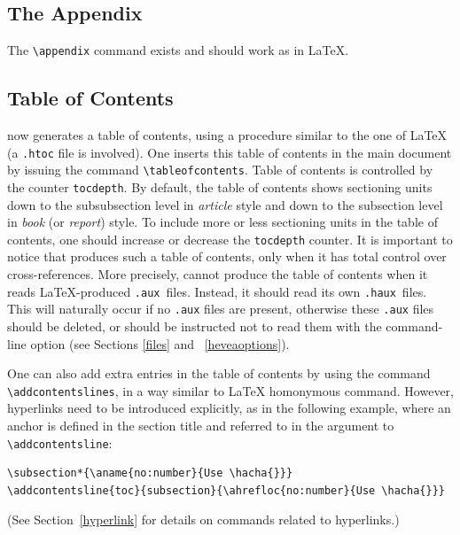 \subsection{The Appendix}
The \verb+\appendix+ command exists and should work as in \LaTeX.

\subsection{Table of Contents}
%
%
\hevea{} now generates a table of contents, using a procedure similar
to the one of \LaTeX
(a \texttt{.htoc} file is involved).
One inserts this table of contents in the main document by issuing
the command \verb+\tableofcontents+.
Table of contents is controlled by the counter  \verb+tocdepth+.
By default, the table of contents shows sectioning units down to the
subsubsection level in \textit{article} style and down to the subsection level
in \textit{book} (or \textit{report}) style. To include more or less
sectioning units in the
table of contents, one should increase or decrease the \verb+tocdepth+
counter.
It is important to notice that \hevea{} produces such a table of
contents, only when it has total control over cross-references.
More precisely, \hevea{} cannot produce the table of contents when it
reads \LaTeX{}-produced \texttt{.aux}~files.
Instead, it should read its own \texttt{.haux}~files.
This will naturally occur if no \texttt{.aux} files are present,
otherwise these \texttt{.aux} files should be deleted, or \hevea{}
should be instructed not to read them with the command-line option
(see Sections \ref{files} and ~\ref{heveaoptions}).

One can also add extra entries in the table of contents by using
the command \verb+\addcontentslines+, in a way similar
to \LaTeX{} homonymous command.
However, hyperlinks need to be introduced explicitly,
as in the following example, where
an anchor is defined in the section title and referred to in the
argument to \verb+\addcontentsline+:
\begin{verbatim}
\subsection*{\aname{no:number}{Use \hacha{}}}
\addcontentsline{toc}{subsection}{\ahrefloc{no:number}{Use \hacha{}}}
\end{verbatim}
(See Section~\ref{hyperlink} for details on commands related to hyperlinks.)

